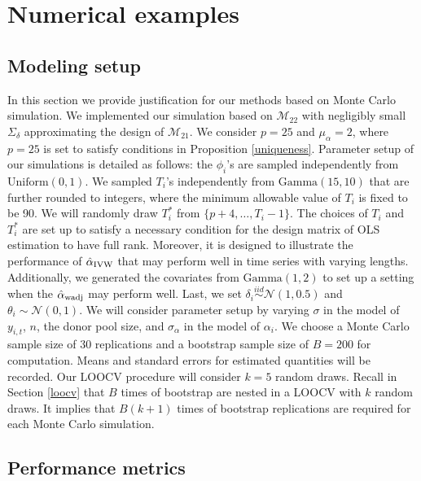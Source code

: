 \documentclass[11pt,3p,review,authoryear]{elsarticle}
\newcommand{\simiid}{\stackrel{iid}{\sim}} %
\def\mrm#1{\mathrm{#1}} %
\def\normal#1#2{\mathcal{N}(#1,#2)} %
\def\mc#1{\mathcal{#1}} %
\theoremstyle{definition}
\begin{document}
\section{Numerical examples}
\label{simulation}

\subsection{Modeling setup}

In this section we provide justification for our methods based on Monte Carlo simulation. We implemented our simulation based on $\mc{M}_{22}$ with negligibly small $\Sigma_{\delta}$ approximating the design of $\mathcal{M}_{21}$.  We consider $p=25$ and $\mu_{\alpha}=2$, where $p = 25$ is set to satisfy conditions in Proposition \ref{uniqueness}. Parameter setup of our simulations is detailed as follows: the $\phi_i$'s are sampled independently from $\mrm{Uniform}(0,1)$. We sampled $T_i$'s independently from  $\text{Gamma}(15, 10)$ that are further rounded to integers, where the minimum allowable value of $T_i$ is fixed to be 90. We will randomly draw $T_i^*$ from $\{p + 4, \ldots, T_i-1\}$. The choices of $T_i$ and $T_i^*$ are set up to satisfy a necessary condition for the design matrix of OLS estimation to have full rank. Moreover, it is  designed to illustrate the performance of $\hat{\alpha}_{\rm IVW}$ that may perform well in time series with varying lengths. Additionally, we generated the covariates from $\text{Gamma}(1,2)$ to set up a setting when the $\hat{\alpha}_{\rm wadj}$ may perform well. Last, we set $\delta_i\simiid  \normal{1}{0.5}$ and $\theta_i \sim \normal{0}{1}$. We will consider parameter setup by varying $\sigma$ in the model of $y_{i,t}$, $n$, the donor pool size, and $\sigma_{\alpha}$ in the model of $\alpha_i$. We choose a Monte Carlo sample size of $30$ replications and a bootstrap sample size of $B = 200$ for computation. Means and standard errors for estimated quantities will be recorded. Our LOOCV procedure will consider $k=5$ random draws. Recall in Section \ref{loocv} that $B$ times of bootstrap are nested in a LOOCV with $k$ random draws. It implies that $B(k+1)$ times of bootstrap replications are required for each Monte Carlo simulation.


\subsection{Performance metrics}
\end{document}
